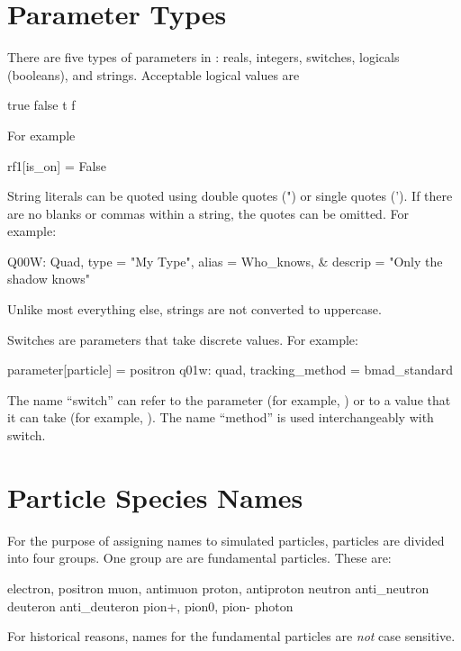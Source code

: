 {{{{{%
\section{Parameter Types}
\label{s:param.types}

There are five types of parameters in \bmad: reals, integers, switches, logicals (booleans), and
strings. Acceptable logical values are
\begin{example}
   true    false
   t       f
\end{example}
For example
\begin{example}
  rf1[is_on] = False
\end{example}

String literals can be quoted using double quotes (") or single quotes (').  If there are no blanks
or commas within a string, the quotes can be omitted. For example:
\begin{example}
  Q00W: Quad, type = "My Type", alias = Who_knows, &
                                  descrip = "Only the shadow knows"
\end{example}
Unlike most everything else, strings are not converted to uppercase.

Switches are parameters that take discrete values. For example:
\begin{example}
  parameter[particle] = positron          
  q01w: quad, tracking_method = bmad_standard 
\end{example}
The name ``switch'' can refer to the parameter (for example, ) or to a value
that it can take (for example, ). The name ``method'' is used interchangeably with
switch.

\section{Particle Species Names}
\label{s:species.name}

For the purpose of assigning names to simulated particles, particles are divided into four
groups. One group are are fundamental particles. These are:
\begin{example}
  electron,  positron
  muon,      antimuon
  proton,    antiproton
  neutron    anti_neutron
  deuteron   anti_deuteron
  pion+,     pion0,      pion-
  photon
\end{example}
For historical reasons, names for the fundamental particles are {\em not} case sensitive.

}}}}}

